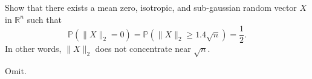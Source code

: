 \begin{problem*}[Exercise 6.3.6]\label{ex6.3.6}
	Show that there exists a mean zero, isotropic, and sub-gaussian random vector \(X\) in \(\mathbb{R} ^n\) such that
	\[
		\mathbb{P} (\lVert X \rVert _2 = 0)
		= \mathbb{P} (\lVert X \rVert _2 \geq 1.4 \sqrt{n} )
		= \frac{1}{2}.
	\]
	In other words, \(\lVert X \rVert _2\) does not concentrate near \(\sqrt{n} \).
\end{problem*}
\begin{answer}
	Omit.
\end{answer}